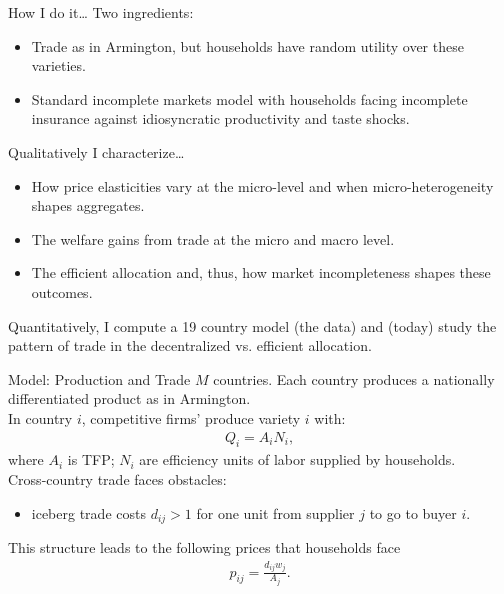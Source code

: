 \documentclass[9pt,pdftex,aspectratio=1610]{beamer}
\theoremstyle{definition}
\begin{document}
\begin{frame}[t]{How I do it\ldots}
Two ingredients:
\begin{itemize}
\smallskip
\item Trade as in Armington, but households have random utility over these varieties.
\smallskip
\item Standard incomplete markets model with households facing incomplete insurance against idiosyncratic productivity and taste shocks.
\end{itemize}
\bigskip
Qualitatively I characterize\ldots
\begin{itemize}
\smallskip
\item How price elasticities vary at the micro-level and when micro-heterogeneity shapes aggregates.
\smallskip
\item The welfare gains from trade at the micro and macro level.
\smallskip
\item The efficient allocation and, thus, how market incompleteness shapes these outcomes.
\end{itemize}
\bigskip
Quantitatively, I compute a 19 country model (the \citet{eaton2002technology} data) and (today) study the pattern of trade in the decentralized vs. efficient allocation.
\end{frame}


\begin{frame}[t]{Model: Production and Trade}
\smallskip
$M$ countries. Each country produces a nationally differentiated product as in Armington.\\
\bigskip
\medskip
In country $i$, competitive firms' produce variety $i$ with:
\begin{align*}
Q_i = A_i N_i,
\end{align*}
where $A_i$ is TFP; $N_i$ are efficiency units of labor supplied by households.\\
\bigskip
\medskip
Cross-country trade faces obstacles:
\begin{itemize}
\smallskip
\item iceberg trade costs $d_{ij} > 1$ for one unit from supplier $j$ to go to buyer $i$.
\end{itemize}
\bigskip
\medskip
This structure leads to the following prices that households face
\begin{align*}
p_{ij} = \frac{d_{ij}w_{j}}{A_{j}}.
\end{align*}
\end{frame}
\end{document}

